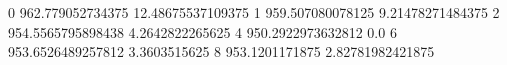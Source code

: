 0 962.779052734375 12.48675537109375
1 959.507080078125 9.21478271484375
2 954.5565795898438 4.2642822265625
4 950.2922973632812 0.0
6 953.6526489257812 3.3603515625
8 953.1201171875 2.82781982421875
